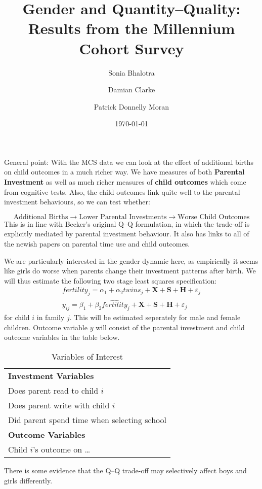 \documentclass[a4paper, 11pt]{article}
\title{Gender and Quantity--Quality: Results from the Millennium Cohort Survey}
\author{Sonia Bhalotra \and Damian Clarke \and Patrick Donnelly Moran}
\date{\today}
\theoremstyle{plain}
\begin{document}
\sffamily
\maketitle

General point: With the MCS data we can look at the effect of additional births
on child outcomes in a much richer way.  We have measures of both
\textbf{Parental Investment} as well as much richer measures of
\textbf{child outcomes} which come from cognitive tests.  Also, the child
outcomes link quite well to the parental investment behaviours, so we can
test whether:

\[
\text{Additional Births}\rightarrow\text{Lower Parental Investments}\rightarrow\text{Worse Child Outcomes}
\]
This is in line with Becker's original Q--Q formulation, in which the
trade-off is explicitly mediated by parental investment behaviour.  It also
has links to all of the newish papers on parental time use and child outcomes.

We are particularly interested in the gender dynamic here, as empirically it
seems like girls do worse when parents change their investment patterns after
birth.  We will thus estimate the following two stage least squares specification:
\begin{eqnarray}
  fertility_j = \alpha_1 + \alpha_2 twins_j + \bm{X} + \bm{S} + \bm{H} + \varepsilon_j \\
  y_{ij} = \beta_1 + \beta_2 \widehat{fertility}_j + \bm{X} + \bm{S} + \bm{H} + \varepsilon_j 
\end{eqnarray}
for child $i$ in family $j$.  This will be estimated seperately for male and female children.
Outcome variable $y$ will consist of the parental investment and child outcome variables in
the table below.
\begin{table}[htpb!]
\caption{Variables of Interest}
  \begin{tabular}{l} \toprule
  \textbf{Investment Variables}  \\
  Does parent read to child $i$  \\
  Does parent write with child $i$  \\
  Did parent spend time when selecting school  \\
  \textbf{Outcome Variables}  \\
  Child $i$'s outcome on \ldots \\
  \bottomrule
  \end{tabular}
\end{table}

There is some evidence that the Q--Q trade-off may selectively affect boys and girls
differently.  \citet{Juhnetal2015}
\end{document}
